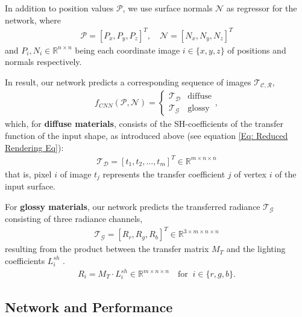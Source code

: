 In addition to position values  $\mathcal{P}$, we use surface normals $\mathcal{N}$ as regressor for the network, where 
\begin{align*}
	\mathcal{P} = [ P_x, P_y, P_z ]^T , \quad
	\mathcal{N} = [ N_x, N_y, N_z ] ^T 
\end{align*}
and  $P_i, N_i \in \mathbb{R}^{n \times n }$ being each coordinate image  $i \in \{ x,y,z\}$ of positions and normals respectively. 

In result, our network predicts a corresponding sequence of images $\mathcal{T_{C,R}}$,
\begin{align*}
	f_{CNN} (  \mathcal{P} , \mathcal{N} ) = 
	\begin{cases}
	\mathcal{T_D}  & \text{diffuse} \\
	\mathcal{T_G} & \text{glossy}
	\end{cases},
\end{align*}
which, for \textbf{diffuse materials}, consists of the SH-coefficients of the transfer function of the input shape, as introduced above (see equation \ref{Eq: Reduced Rendering Eq}):
\begin{align*}
	\mathcal{T_D} = [ t_1, t_2, \dots, t_m ]^T \in \mathbb{R}^{m \times n \times n} 
\end{align*}
that is, pixel $i$ of image $t_j$ represents the transfer coefficient $j$ of vertex $i$ of the input surface.

For \textbf{glossy materials}, our network predicts the transferred radiance $\mathcal{T_G}$ consisting of three radiance channels, 
\begin{align*}
\mathcal{T_G} = [R_r , R_g ,R_b]^T \in \mathbb{R}^{3 \times m \times n \times n} 
\end{align*}
resulting from the product between the transfer matrix $M_T$ and the lighting coefficients  $ L^{sh}_i$ \cite{sloan2002precomputed}. 
\begin{align*}
R_i= M_T \cdot L^{sh}_i   \in \mathbb{R}^{m \times n \times n}   \quad \text{for }~  i \in \{r,g,b\} .
\end{align*}

\subsection{Network and Performance }
